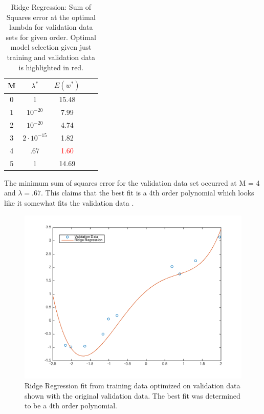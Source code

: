 \documentclass[10pt,twocolumn]{article}
\begin{document}
\begin{table}
\begin{center}
  \begin{tabular}{ | c | c | c | c | c | }
    \hline
     M & $\lambda ^*$  &$ E(w^*)$ \\ \hline
     0 & 1 & 15.48  \\ \hline
     1 & $10^{-20}$ & 7.99   \\ \hline
     2 & $10^{-20}$ & 4.74   \\ \hline
     3 & $2 \cdot 10^{-15}$ & 1.82   \\ \hline
     4 & .67 & \textcolor{red}{1.60}   \\ \hline
     5 & 1 & 14.69  \\ \hline    
    \hline
  \end{tabular}
  \caption{Ridge Regression:  Sum of Squares error at the optimal lambda for validation data sets for given order. Optimal model selection given just training and validation data is highlighted in red. }
\end{center}
\label{table:ave_sse}
\end{table}



The minimum sum of squares error for the validation data set occurred at M = 4 and $\lambda = .67$. This claims that the best fit is a 4th order polynomial which looks like it somewhat fits the validation data .
\begin{figure}[H]
\center
\includegraphics[scale =.4]{valplot.png}
\caption{Ridge Regression fit from training data optimized on validation data shown with the original validation data. The best fit was determined to be a 4th order polynomial.}
\end{figure}
\end{document}
